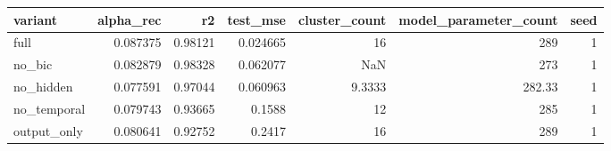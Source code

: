 \begin{tabular}{lrrrrrr}
\toprule
variant & alpha\_rec & r2 & test\_mse & cluster\_count & model\_parameter\_count & seed \\
\midrule
full & 0.087375 & 0.98121 & 0.024665 & 16 & 289 & 1 \\
no\_bic & 0.082879 & 0.98328 & 0.062077 & NaN & 273 & 1 \\
no\_hidden & 0.077591 & 0.97044 & 0.060963 & 9.3333 & 282.33 & 1 \\
no\_temporal & 0.079743 & 0.93665 & 0.1588 & 12 & 285 & 1 \\
output\_only & 0.080641 & 0.92752 & 0.2417 & 16 & 289 & 1 \\
\bottomrule
\end{tabular}
